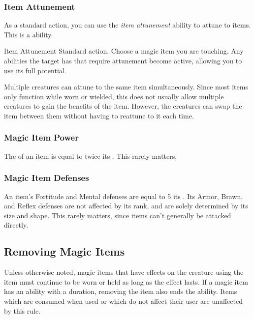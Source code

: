     \subsubsection{Item Attunement}\label{Item Attunement}

      As a standard action, you can use the \textit{item attunement} ability to attune to items.
      This is a \magical ability.

      \begin{attuneability}{Item Attunement}{}
        \abilityusagetime Standard action.
        \rankline
        Choose a magic item you are touching.
        Any abilities the target has that require attunement become active, allowing you to use its full potential.
      \end{attuneability}

       Multiple creatures can attune to the same item simultaneously.
      Since most items only function while worn or wielded, this does not usually allow multiple creatures to gain the benefits of the item.
      However, the creatures can swap the item between them without having to reattune to it each time.

    \subsubsection{Magic Item Power}\label{Magic Item Power}
      The  of an item is equal to twice its .
      This rarely matters.

    \subsubsection{Magic Item Defenses}\label{Magic Item Defenses}
      An item's Fortitude and Mental defenses are equal to 5 \add its .
      Its Armor, Brawn, and Reflex defenses are not affected by its rank, and are solely determined by its size and shape.
      This rarely matters, since  items can't generally be attacked directly.

  \subsection{Removing Magic Items}
    Unless otherwise noted, magic items that have effects on the creature using the item must continue to be worn or held as long as the effect lasts.
    If a magic item has an ability with a duration, removing the item also ends the ability.
    Items which are consumed when used or which do not affect their user are unaffected by this rule.

